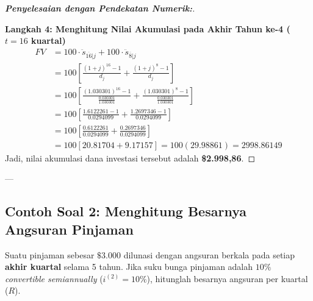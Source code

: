 \documentclass[11pt,a4paper]{article}
\begin{document}
\begin{proof}[\textbf{Penyelesaian dengan Pendekatan Numerik:}]
\begin{center}
\end{center}

\textbf{Langkah 4: Menghitung Nilai Akumulasi pada Akhir Tahun ke-4 ($t = 16$ kuartal)}
\begin{align*}
    FV &= 100 \cdot \ddot{s}_{\overline{16}|j} + 100 \cdot \ddot{s}_{\overline{8}|j} \\
       &= 100 \left[ \frac{(1+j)^{16} - 1}{d_j} + \frac{(1+j)^8 - 1}{d_j} \right] \\
       &= 100 \left[ \frac{(1.030301)^{16} - 1}{\frac{0.030301}{1.030301}} + \frac{(1.030301)^8 - 1}{\frac{0.030301}{1.030301}} \right] \\
       &= 100 \left[ \frac{1.6122261 - 1}{0.0294099} + \frac{1.2697346 - 1}{0.0294099} \right] \\
       &= 100 \left[ \frac{0.6122261}{0.0294099} + \frac{0.2697346}{0.0294099} \right] \\
       &= 100 \left[ 20.81704 + 9.17157 \right] = 100 (29.98861) = \mathbf{2998.86149}
\end{align*}
Jadi, nilai akumulasi dana investasi tersebut adalah \textbf{\$2.998,86}.
\end{proof}

---

\subsection{Contoh Soal 2: Menghitung Besarnya Angsuran Pinjaman}

\begin{examplebox}
Suatu pinjaman sebesar $\$3.000$ dilunasi dengan angsuran berkala pada setiap \textbf{akhir kuartal} selama 5 tahun. Jika suku bunga pinjaman adalah $10\%$ \textit{convertible semiannually} ($i^{(2)} = 10\%$), hitunglah besarnya angsuran per kuartal ($R$).
\end{examplebox}
\end{document}
